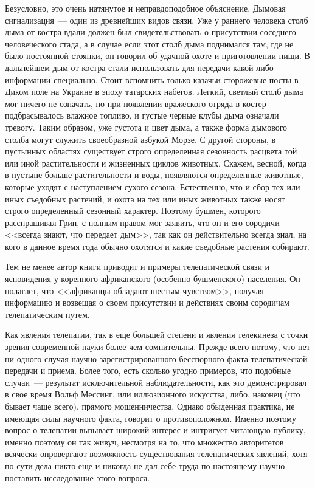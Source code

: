 \documentclass[12pt,a4paper,twoside,openany,svgnames]{memoir}
\begin{document}
Безусловно, это очень натянутое и неправдоподобное объяснение. Дымовая сигнализация~--- один из древнейших видов связи. Уже у раннего человека столб дыма от костра вдали должен был свидетельствовать о присутствии соседнего человеческого стада, а в случае если этот столб дыма поднимался там, где не было постоянной стоянки, он говорил об удачной охоте и приготовлении пищи. В дальнейшем дым от костра стали использовать для передачи какой-либо информации специально. Стоит вспомнить только казачьи сторожевые посты в Диком поле на Украине в эпоху татарских набегов. Легкий, светлый столб дыма мог ничего не означать, но при появлении вражеского отряда в костер подбрасывалось влажное топливо, и густые черные клубы дыма означали тревогу. Таким образом, уже густота и цвет дыма, а также форма дымового столба могут служить своеобразной азбукой Морзе. С другой стороны, в пустынных областях существует строго определенная сезонность расцвета той или иной растительности и жизненных циклов животных. Скажем, весной, когда в пустыне больше растительности и воды, появляются определенные животные, которые уходят с наступлением сухого сезона. Естественно, что и сбор тех или иных съедобных растений, и охота на тех или иных животных также носят строго определенный сезонный характер. Поэтому бушмен, которого расспрашивал Грин, с полным правом мог заявить, что он и его сородичи <<всегда знают, что передает дым>>, так как он действительно всегда знал, на кого в данное время года обычно охотятся и какие съедобные растения собирают.

Тем не менее автор книги приводит и примеры телепатической связи и ясновидения у коренного африканского (особенно бушменского) населения. Он полагает, что <<африканцы обладают шестым чувством>>, получая информацию и возвещая о своем присутствии и действиях своим сородичам телепатическим путем.

Как явления телепатии, так в еще большей степени и явления телекинеза с точки зрения современной науки более чем сомнительны. Прежде всего потому, что нет ни одного случая научно зарегистрированного бесспорного факта телепатической передачи и приема. Более того, есть сколько угодно примеров, что подобные случаи~--- результат исключительной наблюдательности, как это демонстрировал в свое время Вольф Мессинг, или иллюзионного искусства, либо, наконец (что бывает чаще всего), прямого мошенничества. Однако обыденная практика, не имеющая силы научного факта, говорит о противоположном. Именно поэтому вопрос о телепатии вызывает широкий интерес и интригует читающую публику, именно поэтому он так живуч, несмотря на то, что множество авторитетов всячески опровергают возможность существования телепатических явлений, хотя по сути дела никто еще и никогда не дал себе труда по-настоящему научно поставить исследование этого вопроса.
\end{document}
